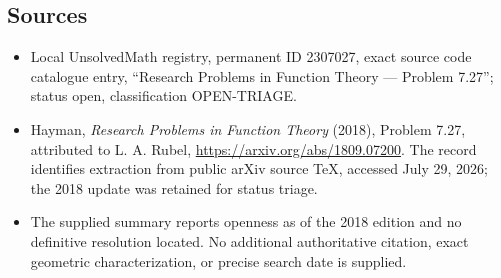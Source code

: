 \documentclass[11pt]{article}
\begin{document}
\subsection{Sources}
\begin{itemize}
\item Local UnsolvedMath registry, permanent ID 2307027, exact source code catalogue entry, ``Research Problems in Function Theory --- Problem 7.27''; status open, classification OPEN-TRIAGE.
\item Hayman, \emph{Research Problems in Function Theory} (2018), Problem 7.27, attributed to L. A. Rubel, \url{https://arxiv.org/abs/1809.07200}. The record identifies extraction from public arXiv source TeX, accessed July 29, 2026; the 2018 update was retained for status triage.
\item The supplied summary reports openness as of the 2018 edition and no definitive resolution located. No additional authoritative citation, exact geometric characterization, or precise search date is supplied.
\end{itemize}
\end{document}
